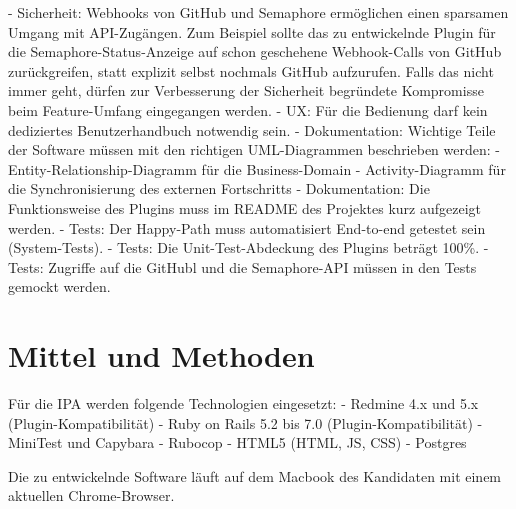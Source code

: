 - Sicherheit: Webhooks von GitHub und Semaphore ermöglichen einen sparsamen Umgang mit API-Zugängen. Zum Beispiel sollte das zu entwickelnde Plugin für die Semaphore-Status-Anzeige auf schon geschehene Webhook-Calls von GitHub zurückgreifen, statt explizit selbst nochmals GitHub aufzurufen. Falls das nicht immer geht, dürfen zur Verbesserung der Sicherheit begründete Kompromisse beim Feature-Umfang eingegangen werden. \newline
- UX: Für die Bedienung darf kein dediziertes Benutzerhandbuch notwendig sein. \newline
- Dokumentation: Wichtige Teile der Software müssen mit den richtigen UML-Diagrammen beschrieben werden: \newline 
 - Entity-Relationship-Diagramm für die Business-Domain \newline
 - Activity-Diagramm für die Synchronisierung des externen Fortschritts \newline
- Dokumentation: Die Funktionsweise des Plugins muss im README des Projektes kurz aufgezeigt werden. \newline
- Tests: Der Happy-Path muss automatisiert End-to-end getestet sein (System-Tests). \newline
- Tests: Die Unit-Test-Abdeckung des Plugins beträgt 100\%. \newline
- Tests: Zugriffe auf die GitHubl und die Semaphore-API müssen in den Tests gemockt werden. \newline

\section{Mittel und Methoden}
Für die IPA werden folgende Technologien eingesetzt: \newline
- Redmine 4.x und 5.x (Plugin-Kompatibilität) \newline
- Ruby on Rails 5.2 bis 7.0 (Plugin-Kompatibilität) \newline
- MiniTest und Capybara \newline
- Rubocop \newline
- HTML5 (HTML, JS, CSS) \newline
- Postgres \newline

Die zu entwickelnde Software läuft auf dem Macbook des Kandidaten mit einem aktuellen Chrome-Browser. \newline

